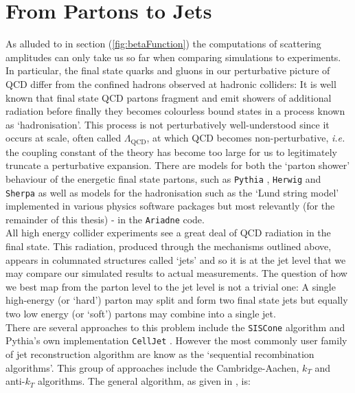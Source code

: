 \section{From Partons to Jets}

	As alluded to in section (\ref{fig:betaFunction}) the computations of scattering amplitudes can only take us so far
	when comparing simulations to experiments.  In particular, the final state quarks and gluons in our perturbative
	picture of QCD differ from the confined hadrons observed at hadronic colliders:  It is well known that final state
	QCD partons fragment and emit showers of additional radiation before finally they becomes colourless bound states
	in a process known as `hadronisation'.  This process is not perturbatively well-understood since it occurs at scale,
	often called $\Lambda_{\text{QCD}}$, at which QCD becomes non-perturbative, \emph{i.e.} the coupling constant of the
	theory has become too large for us to legitimately truncate a perturbative expansion.  There are models for both
	the `parton shower' behaviour of the energetic final state partons, such as \texttt{Pythia} \cite{Sjostrand:2007gs},
	\texttt{Herwig} \cite{Corcella:2000bw} and \texttt{Sherpa} \cite{Hoche:2014kca} as well as models for the hadronisation
	such as the `Lund string model' \cite{Andersson:2002ap} implemented in various physics software packages but most
	relevantly (for the remainder of this thesis) - in the \texttt{Ariadne} code.\\All high energy collider experiments
	see a great deal of QCD radiation in the final state.  This radiation, produced through the mechanisms outlined above,
	appears in columnated structures called `jets' and so it is at the jet level that we may compare our simulated results
	to actual measurements. The question of how we best map from the parton level to the jet level is not a trivial
	one:  A single high-energy (or `hard') parton may split and form two final state jets but equally two low energy (or
	`soft') partons may combine into a single jet.\\There are several approaches to this problem include the \texttt{SISCone}
	algorithm \cite{Salam:2007xv} and Pythia's own implementation \texttt{CellJet} \cite{Sjostrand:2000wi}. However the
	most commonly user family of jet reconstruction algorithm are know as the `sequential recombination algorithms'.
	This group of approaches include the Cambridge-Aachen, $k_T$ and anti-$k_T$ algorithms. The general algorithm, as
	given in \cite{Cacciari:2008gp}, is:

